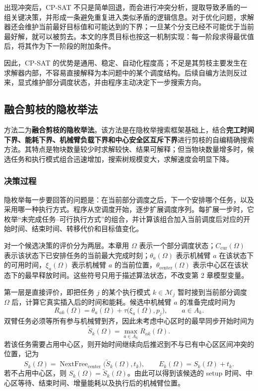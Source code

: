 出现冲突后，CP-SAT 不只是简单回退，而会进行冲突分析，提取导致矛盾的一组关键决策，并形成一条避免重复进入类似矛盾的逻辑信息。对于优化问题，求解器还会维护当前最好目标值和可能达到的下界；一旦某个分支已经不可能优于当前最好解，就可以被剪去。本文的序贯目标也按这一机制实现：每一阶段求得最优值后，将其作为下一阶段的附加条件。

因此，CP-SAT 的优势是通用、稳定、自动化程度高；不足是其剪枝主要发生在求解器内部，不容易直接解释为本问题中的某个调度结构。后续自编方法则反过来，显式维护部分调度状态，并由程序主动决定下一步搜索方向。

\subsection{融合剪枝的隐枚举法}

方法二为\textbf{融合剪枝的隐枚举法}。该方法是在隐枚举搜索框架基础上，结合\textbf{完工时间下界、能耗下界、机械臂负载下界和中心安全区互斥下界}进行剪枝的自编精确搜索方法。其特点是物块数量较少时求解较快、结果可解释；但当物块数量增多时，候选任务和执行模式组合迅速增加，搜索树规模变大，求解速度会明显下降。

\subsubsection{决策过程}

隐枚举每一步要回答的问题是：在当前部分调度之后，下一个安排哪个任务，以及采用哪一种执行方式。程序从空调度开始，逐步扩展调度序列。每扩展一步时，它枚举“未完成任务--可行执行方式”的组合，并计算该组合加入当前调度后对应的开始时间、结束时间、转移代价和目标值变化。

对一个候选决策的评价分为两层。本章用 $\Omega$ 表示一个部分调度状态；$C_{\mathrm{cur}}(\Omega)$ 表示该状态下已安排任务的当前最大完成时刻；$\theta_a(\Omega)$ 表示机械臂 $a$ 在该状态下的可用时间，$\xi_a(\Omega)$ 表示机械臂 $a$ 的当前位置，$\theta_{\mathrm{center}}(\Omega)$ 表示中心区在该状态下的最早释放时间。这些符号只用于描述算法状态，不改变第 2 章模型变量。

第一层是直接评价，即把任务 $j$ 的某个执行模式 $k\in\mathcal{M}_j$ 暂时接到当前部分调度 $\Omega$ 后，计算它真实插入后的时间和能耗。候选中机械臂 $a$ 的准备完成时间为
\[
    R_{ak}(\Omega)=\theta_a(\Omega)+\tau\bigl(\xi_a(\Omega),p_j\bigr),
    \qquad a\in A_k .
\]
双臂任务必须等所有参与机械臂到齐，因此未考虑中心区时的最早同步开始时间为
\[
    \widetilde S_k(\Omega)=\max_{a\in A_k} R_{ak}(\Omega).
\]
若该任务需要占用中心区，则开始时间继续向后推迟到不与已有中心区区间冲突的位置，记为
\[
    S_k(\Omega)=\operatorname{NextFree}_{\mathrm{center}}\bigl(\widetilde S_k(\Omega),t_k\bigr),
    \qquad
    E_k(\Omega)=S_k(\Omega)+t_k .
\]
若不占用中心区，则 $S_k(\Omega)=\widetilde S_k(\Omega)$。由此可以得到该候选的 setup 时间、中心区等待、结束时间、增量能耗以及执行后的机械臂位置。

